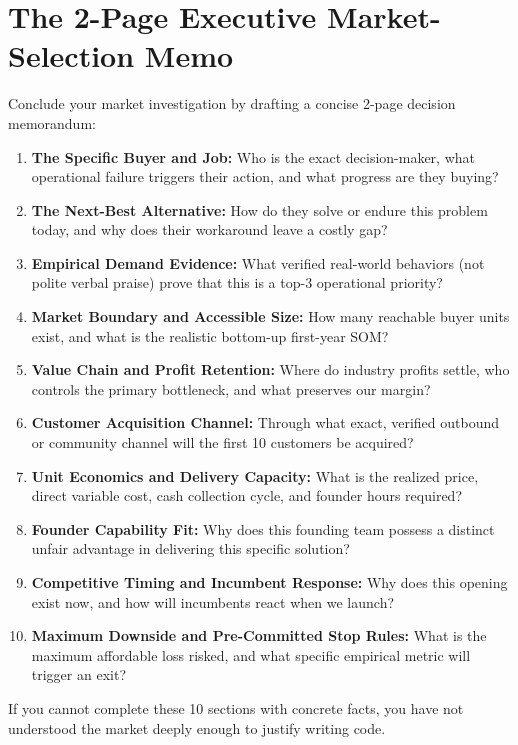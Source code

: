 \section{The 2-Page Executive Market-Selection Memo}

Conclude your market investigation by drafting a concise 2-page decision memorandum:

\begin{enumerate}[leftmargin=14pt,itemsep=2pt,topsep=1pt,parsep=0pt]
  \item \textbf{The Specific Buyer and Job:} Who is the exact decision-maker, what operational failure triggers their action, and what progress are they buying?
  \item \textbf{The Next-Best Alternative:} How do they solve or endure this problem today, and why does their workaround leave a costly gap?
  \item \textbf{Empirical Demand Evidence:} What verified real-world behaviors (not polite verbal praise) prove that this is a top-3 operational priority?
  \item \textbf{Market Boundary and Accessible Size:} How many reachable buyer units exist, and what is the realistic bottom-up first-year SOM?
  \item \textbf{Value Chain and Profit Retention:} Where do industry profits settle, who controls the primary bottleneck, and what preserves our margin?
  \item \textbf{Customer Acquisition Channel:} Through what exact, verified outbound or community channel will the first 10 customers be acquired?
  \item \textbf{Unit Economics and Delivery Capacity:} What is the realized price, direct variable cost, cash collection cycle, and founder hours required?
  \item \textbf{Founder Capability Fit:} Why does this founding team possess a distinct unfair advantage in delivering this specific solution?
  \item \textbf{Competitive Timing and Incumbent Response:} Why does this opening exist now, and how will incumbents react when we launch?
  \item \textbf{Maximum Downside and Pre-Committed Stop Rules:} What is the maximum affordable loss risked, and what specific empirical metric will trigger an exit?
\end{enumerate}

If you cannot complete these 10 sections with concrete facts, you have not understood the market deeply enough to justify writing code.
